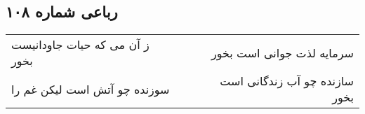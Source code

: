 \begin{center}
\section*{رباعی شماره ۱۰۸}
\label{sec:sh108}
\begin{longtable}{l p{0.5cm} r}
ز آن می که حیات جاودانیست بخور
&&
سرمایه لذت جوانی است بخور
\\
سوزنده چو آتش است لیکن غم را
&&
سازنده چو آب زندگانی است بخور
\\
\end{longtable}
\end{center}
